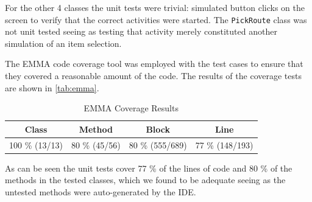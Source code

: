 For the other 4 classes the unit tests were trivial: simulated button clicks on the screen to verify that the correct activities were started. The \texttt{PickRoute} class was not unit tested seeing as testing that activity merely constituted another simulation of an item selection.

The EMMA code coverage tool was employed with the test cases to ensure that they covered a reasonable amount of the code. The results of the coverage tests are shown in \autoref{tab:emma}.

\begin{table}[!ht]
	\centering
	\begin{tabular}{| c | c | c | c |}
		\hline
		\textbf{Class} & \textbf{Method} & \textbf{Block} & \textbf{Line} \\ \hline
		100 \% (13/13) & 80 \% (45/56) & 80 \% (555/689) & 77 \% (148/193) \\
		\hline
	\end{tabular}
	\caption{EMMA Coverage Results}
	\label{tab:emma}
\end{table}

As can be seen the unit tests cover 77 \% of the lines of code and 80 \% of the methods in the tested classes, which we found to be adequate seeing as the untested methods were auto-generated by the \ac{IDE}.
